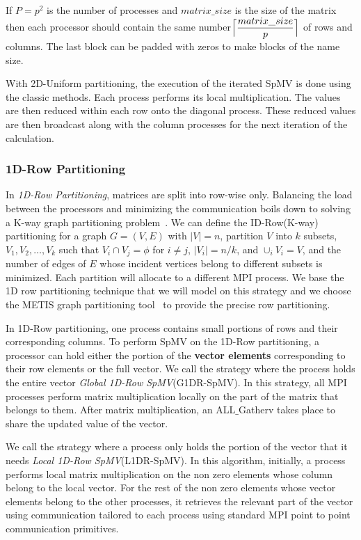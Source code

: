 \documentclass[sigconf,review,anonymous]{acmart}
\begin{document}
If $P=p^2$ is the number of processes
and $matrix\_size$ is the size of the matrix then each processor
should contain the same
number$\Bigl\lceil\dfrac{matrix\_size}{p}\Bigr\rceil$ of rows and
columns. The last block can be padded with zeros to make blocks of the name size.

With 2D-Uniform partitioning, the execution of the iterated SpMV is
done using the classic methods. Each process performs its local
multiplication. The values are then reduced within each row onto the
diagonal process. These reduced values are then broadcast along with the
column processes for the next iteration of the calculation.

\subsubsection{1D-Row Partitioning}

In \textit{1D-Row Partitioning}, matrices are split into row-wise
only. Balancing the load between the processors and minimizing the
communication boils down to solving a K-way graph partitioning
problem~\cite{kaya2013analysis}.  We can define the ID-Row(K-way)
partitioning for a graph $G=(V,E)$ with $|V|=n$, partition $V$ into
$k$ subsets, $V_1, V_2, \dots, V_k$ such that $V_i \cap V_j=\phi$ for
$i\neq j$, $|V_i| = n/k$, and $\cup_i V_i = V$, and the number of
edges of $E$ whose incident vertices belong to different subsets is
minimized. Each partition will allocate to a different MPI
process. We base the 1D row partitioning technique that we will model
on this strategy and we choose the METIS graph partitioning
tool~\cite{karypis1995multilevel} to provide the precise row
partitioning.

In 1D-Row partitioning, one process contains small portions of rows
and their corresponding columns. To perform SpMV on the 1D-Row
partitioning, a processor can hold either the portion of the \textbf{vector
  elements} corresponding to their row elements or the full vector.
We call the strategy where the process holds the entire vector \textit{Global
  1D-Row SpMV}(G1DR-SpMV). In this strategy, all MPI processes
perform matrix multiplication locally on the part of the matrix that
belongs to them. After matrix multiplication, an ALL$\_$Gatherv takes
place to share the updated value of the vector.

We call the strategy where a process only holds the portion of the
vector that it needs \textit{Local 1D-Row SpMV}(L1DR-SpMV).  In this
algorithm, initially, a process performs local matrix multiplication
on the non zero elements whose column belong to the local vector.  For
the rest of the non zero elements whose vector elements belong to the
other processes, it retrieves the relevant part of the vector using
communication tailored to each process using standard MPI point to
point communication primitives.
\end{document}

